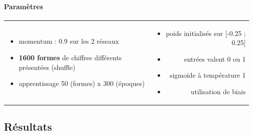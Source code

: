    \paragraph{Paramètres}
      \begin{center}
	\begin{tabular}{lr}
	  \begin{minipage}{230px}
	    \begin{itemize}
	      \item momentum : 0.9 sur les 2 réseaux
	      \item \textbf{1600 formes} de chiffres différents présentées (shuffle) \cite{Handwritten_256}
	      \item apprentissage 50 (formes) x 300 (époques)
	      
	    \end{itemize}
	  \end{minipage}
	  &
	  \begin{minipage}{230px}
	    \begin{itemize}
	      \item poids initialisés sur [-0.25 ; 0.25]
	      \item entrées valent 0 ou 1
	      \item sigmoïde à température 1
	      \item utilisation de biais
	    \end{itemize}
	  \end{minipage}
	\end{tabular}
      \end{center}

  
  \newpage
  \subsection{Résultats}
